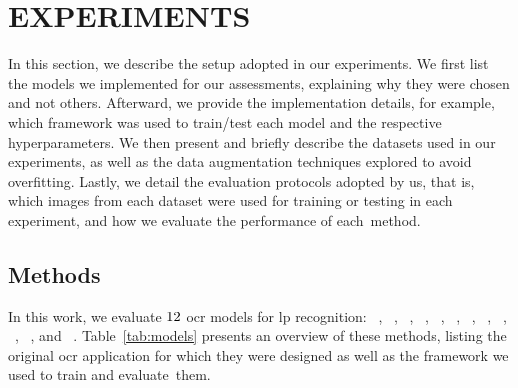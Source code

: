 \section{\uppercase{Experiments}}
\label{sec:experiments}

In this section, we describe the setup adopted in our experiments. 
We first list the models we implemented for our assessments, explaining why they were chosen and not others.
Afterward, we provide the implementation details, for example, which framework was used to train/test each model and the respective hyperparameters.
We then present and briefly describe the datasets used in our experiments, as well as the data augmentation techniques explored to avoid overfitting.
Lastly, we detail the evaluation protocols adopted by us, that is, which images from each dataset were used for training or testing in each experiment, and how we evaluate the performance of each~method.

\subsection{Methods}
\label{sec:experiments-methods}

In this work, we evaluate $12$ \gls*{ocr} models for \gls*{lp} recognition:
\rare~\citep{shi2016robust}, \rtwoam~\citep{lee2016recursive}, \starnet~\citep{liu2016starnet}, \crnn~\citep{shi2017endtoend}, \grcnn~\citep{wang2017deep}, \holistic~\citep{spanhel2017holistic}, \multitaskgabriel~\citep{goncalves2019multitask}, \rosetta~\citep{borisyuk2018rosetta}, \trba~\citep{baek2019what}, \crnet~\citep{silva2020realtime}, \fastocr~\citep{laroca2021towards}, and \vitstrbase~\citep{atienza2021vitstr}. 
Table~\ref{tab:models} presents an overview of these methods, listing the original \gls*{ocr} application for which they were designed as well as the framework we used to train and evaluate~them.

